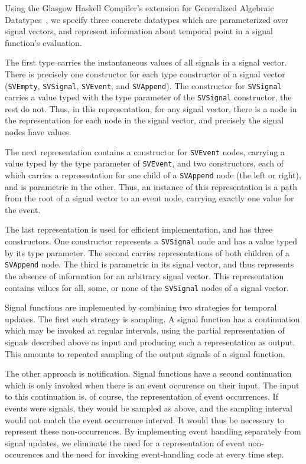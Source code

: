 Using the Glasgow Haskell Compiler's extension for Generalized Algebraic
Datatypes~\cite{Cheney2003,Xi2003,PeytonJones2006}, we specify three concrete
datatypes which are parameterized over signal vectors, and represent
information about  temporal point  in a signal function's evaluation.

The first type carries the instantaneous values of all signals in a signal vector.
There is precisely one constructor for each type constructor of a signal vector ({\tt SVEmpty},
{\tt SVSignal}, {\tt SVEvent}, and {\tt SVAppend}). The constructor for {\tt SVSignal}
carries a value typed with the type parameter of the {\tt SVSignal} constructor,
the rest do not. Thus, in this representation, for any signal vector, there is
a node in the representation for each node in the signal vector, and precisely
the signal nodes have values.

The next representation contains a constructor for {\tt SVEvent} nodes, carrying
a value typed by the type parameter of {\tt SVEvent}, and two constructors, each
of which carries a representation for one child of a {\tt SVAppend} node (the
left or right), and is parametric in the other.  Thus, an instance of this
representation is a path from the root of a signal vector to an event node,
carrying exactly one value for the event.

The last representation is used for efficient implementation, and has three
constructors. One constructor represents a {\tt SVSignal} node and has a value
typed by its type parameter. The second carries representations of both
children of a {\tt SVAppend} node. The third is parametric in its signal vector,
and thus represents the absence of information for an arbitrary signal vector.
This representation contains values for all, some, or none of the {\tt SVSignal}
nodes of a signal vector.

Signal functions are implemented by combining two strategies for temporal
updates. The first such strategy is sampling. A signal function has a 
continuation which may be invoked at regular intervals, using the partial
representation of signals described above as input and producing such a
representation as output. This amounts to repeated sampling of the output
signals of a signal function.

The other approach is notification. Signal functions have a second continuation
which is only invoked when there is an event occurence on their input. The input
to this continuation is, of course, the representation of event occurrences. If
events were signals, they would be sampled as above, and the sampling interval
would not match the event occurrence interval. It would thus be necessary to
represent these non-occurrences. By implementing event handling separately from
signal updates, we eliminate the need for a representation of event
non-occurences and the need for invoking event-handling code at every time step.


